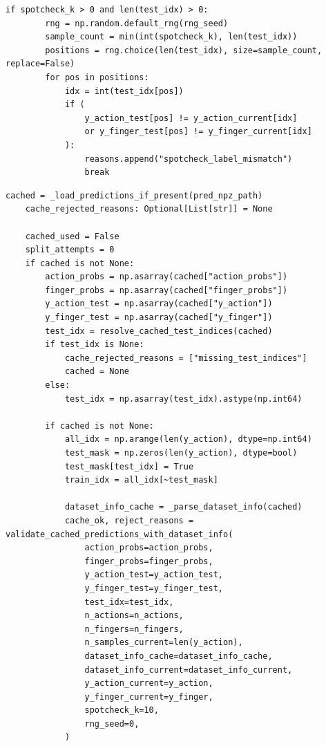 \documentclass[11pt,openany]{book}
\begin{document}
\begin{lstlisting}[language=PythonSafe,caption={Excerpt from \texttt{\detokenize{utils/eval_utils.py}} L139--L150}]
    if spotcheck_k > 0 and len(test_idx) > 0:
        rng = np.random.default_rng(rng_seed)
        sample_count = min(int(spotcheck_k), len(test_idx))
        positions = rng.choice(len(test_idx), size=sample_count, replace=False)
        for pos in positions:
            idx = int(test_idx[pos])
            if (
                y_action_test[pos] != y_action_current[idx]
                or y_finger_test[pos] != y_finger_current[idx]
            ):
                reasons.append("spotcheck_label_mismatch")
                break
\end{lstlisting}

\begin{lstlisting}[language=PythonSafe,caption={Excerpt from \texttt{\detokenize{3_evaluate_model.py}} L773--L813}]
    cached = _load_predictions_if_present(pred_npz_path)
    cache_rejected_reasons: Optional[List[str]] = None

    cached_used = False
    split_attempts = 0
    if cached is not None:
        action_probs = np.asarray(cached["action_probs"])
        finger_probs = np.asarray(cached["finger_probs"])
        y_action_test = np.asarray(cached["y_action"])
        y_finger_test = np.asarray(cached["y_finger"])
        test_idx = resolve_cached_test_indices(cached)
        if test_idx is None:
            cache_rejected_reasons = ["missing_test_indices"]
            cached = None
        else:
            test_idx = np.asarray(test_idx).astype(np.int64)

        if cached is not None:
            all_idx = np.arange(len(y_action), dtype=np.int64)
            test_mask = np.zeros(len(y_action), dtype=bool)
            test_mask[test_idx] = True
            train_idx = all_idx[~test_mask]

            dataset_info_cache = _parse_dataset_info(cached)
            cache_ok, reject_reasons = validate_cached_predictions_with_dataset_info(
                action_probs=action_probs,
                finger_probs=finger_probs,
                y_action_test=y_action_test,
                y_finger_test=y_finger_test,
                test_idx=test_idx,
                n_actions=n_actions,
                n_fingers=n_fingers,
                n_samples_current=len(y_action),
                dataset_info_cache=dataset_info_cache,
                dataset_info_current=dataset_info_current,
                y_action_current=y_action,
                y_finger_current=y_finger,
                spotcheck_k=10,
                rng_seed=0,
            )

\end{lstlisting}
\end{document}
